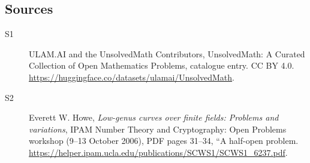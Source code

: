 \documentclass[11pt]{article}
\begin{document}
\subsection{Sources}
\begin{description}
\item[\hypertarget{source:statement:1}{S1}] ULAM.AI and the UnsolvedMath Contributors, UnsolvedMath: A Curated Collection of Open Mathematics Problems, catalogue entry. CC BY 4.0. \url{https://huggingface.co/datasets/ulamai/UnsolvedMath}.
\item[\hypertarget{source:statement:2}{S2}] Everett W. Howe, \emph{Low-genus curves over finite fields: Problems and variations}, IPAM Number Theory and Cryptography: Open Problems workshop (9--13 October 2006), PDF pages 31--34, ``A half-open problem. \url{https://helper.ipam.ucla.edu/publications/SCWS1/SCWS1_6237.pdf}.
\end{description}
\label{end:statement}
\end{document}
